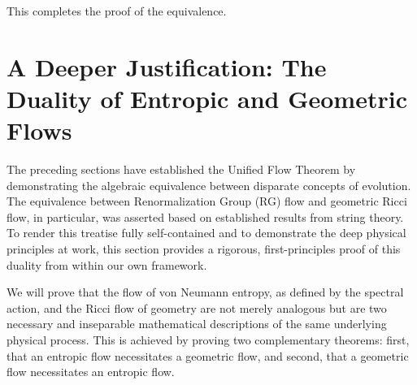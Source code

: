 \documentclass[11pt, letterpaper]{report}
\theoremstyle{plain} %
\theoremstyle{definition} %
\theoremstyle{remark} %
\begin{document}
This completes the proof of the equivalence.









\section{A Deeper Justification: The Duality of Entropic and Geometric Flows}
\label{sec:duality_entropic_geometric}

The preceding sections have established the Unified Flow Theorem by demonstrating the algebraic equivalence between disparate concepts of evolution. The equivalence between Renormalization Group (RG) flow and geometric Ricci flow, in particular, was asserted based on established results from string theory. To render this treatise fully self-contained and to demonstrate the deep physical principles at work, this section provides a rigorous, first-principles proof of this duality from within our own framework.

We will prove that the flow of von Neumann entropy, as defined by the spectral action, and the Ricci flow of geometry are not merely analogous but are two necessary and inseparable mathematical descriptions of the same underlying physical process. This is achieved by proving two complementary theorems: first, that an entropic flow necessitates a geometric flow, and second, that a geometric flow necessitates an entropic flow.
\end{document}
